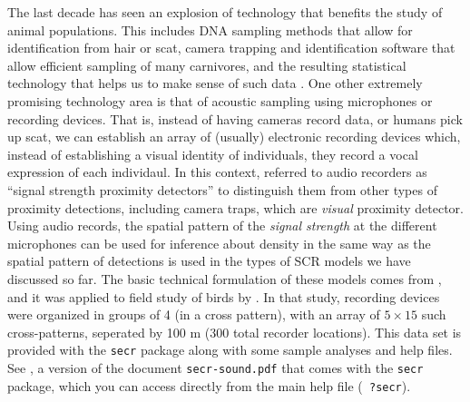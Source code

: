 The last decade has seen an explosion of technology that benefits the
study of animal populations. This includes DNA sampling methods that
allow for identification from hair or scat, camera trapping and
identification software that allow efficient sampling of many
carnivores, and the resulting statistical technology that helps us to
make sense of such data \citep{borchers_efford:2008,
  royle_young:2008,efford_etal:2009ecol, gopalaswamy_etal:2012ecol,
  sollmann_etal:2012ecol, chandler_royle:2012}.  One other extremely
promising technology area is that of acoustic sampling using
microphones or recording devices.  That is, instead of having cameras
record data, or humans pick up scat, we can establish an array of
(usually) electronic recording devices which, instead of establishing
a visual identity of individuals, they record a vocal expression of
each individaul.  In this context, \citet{efford_etal:2009ecol}
referred to audio recorders as ``signal strength proximity detectors''
to distinguish them from other types of proximity detections,
including camera traps, which are {\it visual} proximity detector.
Using audio records, the spatial pattern of the {\it signal strength}
at the different microphones can be used for inference about density
\citep{dawson_efford:2009,efford_etal:2009ecol} in the same way as the
spatial pattern of detections is used in the types of SCR models we
have discussed so far.  The basic technical formulation of these
models comes from \citet{efford_etal:2009ecol}, and it was applied to
field study of birds by \citet{dawson_efford:2009}. In that study,
recording devices were organized in groups of 4 (in a cross pattern),
with an array of $5 \times 15$ such cross-patterns, seperated by 100 m
(300 total recorder locations).  This data set is provided with the
\mbox{\tt secr} package along with some sample analyses and help
files. See \citet{efford_dawson:2010}, a version of the document
\mbox{\tt secr-sound.pdf} that comes with the \mbox{\tt secr} package,
which you can access directly from the main help file (\mbox{\tt
  ?secr}).

